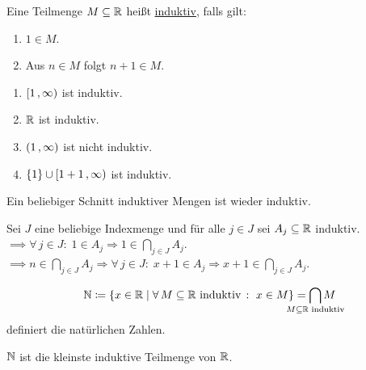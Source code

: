 \documentclass[../ana1.tex]{subfiles}
\begin{document}
\iftoggle{short}{}{\newpage}%

\begin{defi}
	Eine Teilmenge \(M \subseteq \mathbb{R} \) heißt \underline{induktiv}, falls gilt:
	\begin{enumerate}[label= (I\arabic*)]
		\item\label{ax:I1} \(1 \in M \).
		\item\label{ax:I2} Aus \(n \in M \) folgt \(n + 1 \in M \).
	\end{enumerate}
\end{defi}

\begin{bspe}\leavevmode
	\begin{enumerate}[(1)]
		\item \([1 \operatorname{,} \infty) \) ist induktiv.
		\item \(\mathbb{R} \) ist induktiv.
		\item \((1 \operatorname{,} \infty) \) ist nicht induktiv.
		\item \(\{1\} \cup [1+1 \operatorname{,} \infty) \) ist induktiv.
	\end{enumerate}
\end{bspe}

\begin{bem}
	Ein beliebiger Schnitt induktiver Mengen ist wieder induktiv.
\end{bem}
\begin{bew}
	Sei \(J \) eine beliebige Indexmenge und für alle \(j \in J \) sei \(A_{j} \subseteq \mathbb{R} \) induktiv. \\
	\(\implies \forall \, j \in J \colon \; 1 \in A_{j} \Rightarrow 1 \in \underset{j \in J}{\bigcap}A_{j} \). \\
	\(\implies n \in \underset{j \in J}{\bigcap}A_{j} \Rightarrow \forall \, j \in J \colon \; x + 1 \in A_{j} \Rightarrow x + 1 \in \underset{j \in J}{\bigcap}A_{j} \).
\end{bew}

\begin{defi}
	\[\N \coloneqq \set{x \in \R  \; \vert  \; \forall \, M \subseteq \R \text{ induktiv } \colon \; x \in M} = \smashoperator{\bigcap_{M \subseteq \R \text{ induktiv}}} M \]
	definiert die natürlichen Zahlen.
\end{defi}

\begin{bem}
	\(\mathbb{N} \) ist die kleinste induktive Teilmenge von \(\mathbb{R} \).
\end{bem}
\end{document}
